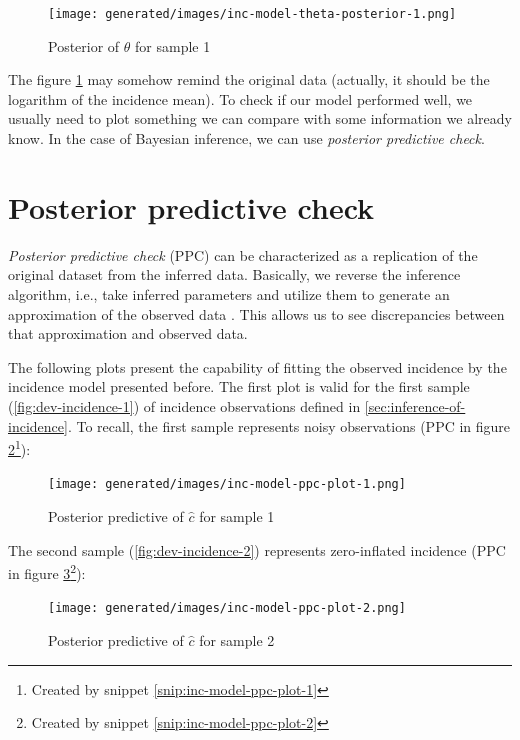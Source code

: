 \documentclass[
  digital, %
  oneside, %
  lof,     %
  lot,     %
]{fithesis4}
\begin{document}
\begin{figure}[H]
  \begin{center}
    \texttt{[image: generated/images/inc-model-theta-posterior-1.png]}
  \end{center}
  \caption{Posterior of $\theta$ for sample 1}
  \label{fig:theta-posterior-1}
\end{figure}

The figure \ref{fig:theta-posterior-1} may somehow remind the original data (actually, it should be the logarithm of the incidence mean).
To check if our model performed well, we usually need to plot something we can compare with some information we already know.
In the case of Bayesian inference, we can use \textit{posterior predictive check}.


\section{Posterior predictive check}

\textit{Posterior predictive check} (PPC) can be characterized as a replication of the original dataset from the inferred data. 
Basically, we reverse the inference algorithm, i.e., take inferred parameters and utilize them to generate an approximation of the observed data \cite{davidson-pilon2015}.
This allows us to see discrepancies between that approximation and observed data.

The following plots present the capability of fitting the observed incidence by the incidence model presented before.
The first plot is valid for the first sample (\ref{fig:dev-incidence-1}) of incidence observations defined in \autoref{sec:inference-of-incidence}.
To recall, the first sample represents noisy observations (PPC in figure \ref{fig:incidence-posterior-1}\footnote{Created by snippet \ref{snip:inc-model-ppc-plot-1}}):

\begin{figure}[H]
  \centering
  \texttt{[image: generated/images/inc-model-ppc-plot-1.png]}
  \caption{Posterior predictive of $\hat{c}$ for sample 1}
  \label{fig:incidence-posterior-1}
\end{figure}

The second sample (\ref{fig:dev-incidence-2}) represents zero-inflated incidence (PPC in figure \ref{fig:incidence-posterior-2}\footnote{Created by snippet \ref{snip:inc-model-ppc-plot-2}}):

\begin{figure}[H]
  \centering
  \texttt{[image: generated/images/inc-model-ppc-plot-2.png]}
  \caption{Posterior predictive of $\hat{c}$ for sample 2}
  \label{fig:incidence-posterior-2}
\end{figure}
\end{document}
